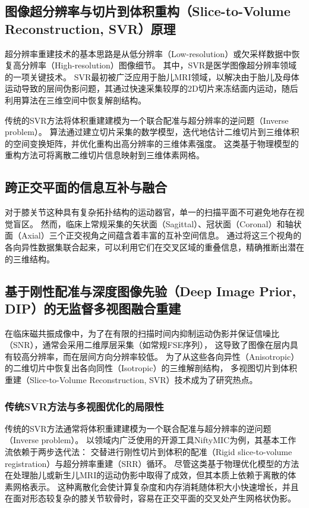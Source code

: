   \subsection{图像超分辨率与切片到体积重构（Slice-to-Volume Reconstruction, SVR）原理}
    超分辨率重建技术的基本思路是从低分辨率（Low-resolution）或欠采样数据中恢复高分辨率（High-resolution）图像细节。
    其中，SVR是医学图像超分辨率领域的一项关键技术。
    SVR最初被广泛应用于胎儿MRI领域，以解决由于胎儿及母体运动导致的层间伪影问题，其通过快速采集较厚的2D切片来冻结面内运动\cite{jiangMRIMovingSubjects2007}，随后利用算法在三维空间中恢复解剖结构。
    \par 传统的SVR方法将体积重建建模为一个联合配准与超分辨率的逆问题（Inverse problem）。
    算法通过建立切片采集的数学模型，迭代地估计二维切片到三维体积的空间变换矩阵，并优化重构出高分辨率的三维体素强度\cite{gholipourRobustSuperresolutionVolume2010}。
    这类基于物理模型的重构方法可将离散二维切片信息映射到三维体素网格。
  \subsection{跨正交平面的信息互补与融合}
    对于膝关节这种具有复杂拓扑结构的运动器官，单一的扫描平面不可避免地存在视觉盲区。
    然而，临床上常规采集的矢状面（Sagittal）、冠状面（Coronal）和轴状面（Axial）三个正交视角之间蕴含着丰富的互补空间信息。
    通过将这三个视角的各向异性数据集联合起来，可以利用它们在交叉区域的重叠信息，精确推断出潜在的三维结构。
  \subsection{基于刚性配准与深度图像先验（Deep Image Prior, DIP）的无监督多视图融合重建}
    在临床磁共振成像中，为了在有限的扫描时间内抑制运动伪影并保证信噪比（SNR），通常会采用二维厚层采集（如常规FSE序列），
    这导致了图像在层内具有较高分辨率，而在层间方向分辨率较低。
    为了从这些各向异性（Anisotropic）的二维切片中恢复出各向同性（Isotropic）的三维解剖结构，
    多视图切片到体积重建（Slice-to-Volume Reconstruction, SVR）技术成为了研究热点。
    \subsubsection{传统SVR方法与多视图优化的局限性}
      传统的SVR方法通常将体积重建建模为一个联合配准与超分辨率的逆问题（Inverse problem）。
      以领域内广泛使用的开源工具NiftyMIC为例，其基本工作流依赖于两步迭代法：
      交替进行刚性切片到体积的配准（Rigid slice-to-volume registration）与超分辨率重建（SRR）循环\cite{ebnerAutomatedFrameworkLocalization2020}。
      尽管这类基于物理优化模型的方法在处理胎儿或新生儿MRI的运动伪影中取得了成效，但其本质上依赖于离散的体素网格表示。
      这种离散化会使计算复杂度和内存消耗随体积大小快速增长，并且在面对形态较复杂的膝关节软骨时，容易在正交平面的交叉处产生网格状伪影。
